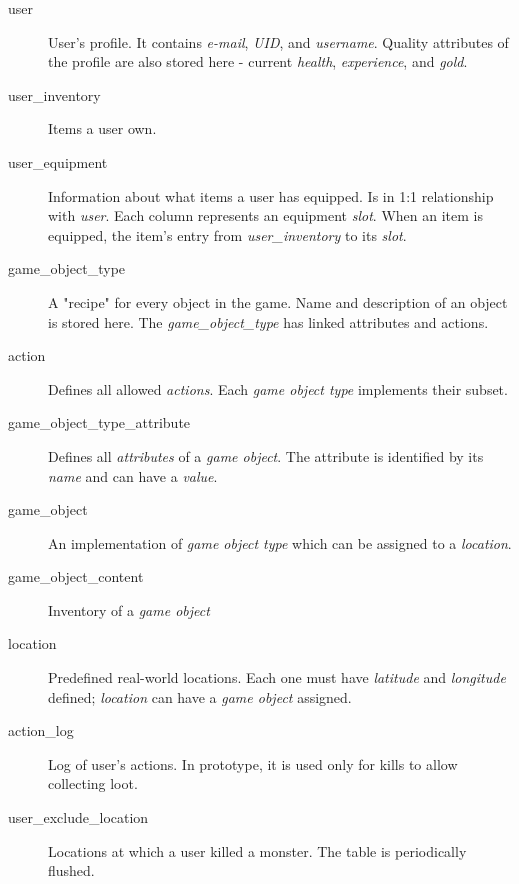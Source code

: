 	\begin{description}
		\item[user] User's profile. It contains \textit{e-mail}, \textit{UID}, and \textit{username}. Quality attributes of the profile are also stored here - current \textit{health}, \textit{experience}, and \textit{gold}.
		
		\item[user\_inventory] Items a user own. 
		
		\item[user\_equipment] Information about what items a user has equipped. Is in 1:1 relationship with \textit{user}. Each column represents an equipment \textit{slot}. When an item is equipped, the item's entry from \textit{user\_inventory} to its \textit{slot}.
		
		\item[game\_object\_type] A "recipe" for every object in the game. Name and description of an object is stored here. The \textit{game\_object\_type} has linked attributes and actions.
	
		\item[action] Defines all allowed \textit{actions}. Each \textit{game object type} implements their subset.
		
		\item[game\_object\_type\_attribute] Defines all \textit{attributes} of a \textit{game object}. The attribute is identified by its \textit{name} and can have a \textit{value}.
	
		\item[game\_object] An implementation of \textit{game object type} which can be assigned to a \textit{location}.
	
		\item[game\_object\_content] Inventory of a \textit{game object}
	
		\item[location] Predefined real-world locations. Each one must have \textit{latitude} and \textit{longitude} defined; \textit{location} can have a \textit{game object} assigned. 
	
		\item[action\_log] Log of user's actions. In prototype, it is used only for kills to allow collecting loot.

		\item[user\_exclude\_location] Locations at which a user killed a monster. The table is periodically flushed. 
		
	\end{description}

